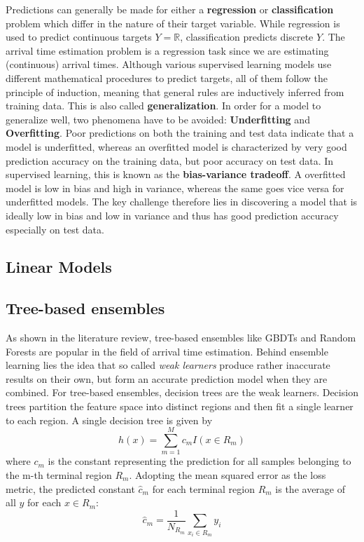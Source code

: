 Predictions can generally be made for either a \textbf{regression} or \textbf{classification} problem which differ in the nature of their target variable. 
While regression is used to predict continuous targets $ Y = \mathbb{R} $, classification predicts discrete $ Y $. The arrival time estimation problem is a regression task since we are estimating (continuous) arrival times.
Although various supervised learning models use different mathematical procedures to predict targets, all of them follow the principle of induction, meaning that general rules are inductively inferred from training data. This is also called \textbf{generalization}.  
In order for a model to generalize well, two phenomena have to be avoided: \textbf{Underfitting} and \textbf{Overfitting}. 
Poor predictions on both the training and test data indicate that a model is underfitted, whereas an overfitted model is characterized by very good prediction accuracy on the training data, but poor accuracy on test data. 
In supervised learning, this is known as the \textbf{bias-variance tradeoff}. 
A overfitted model is low in bias and high in variance, whereas the same goes vice versa for underfitted models. 
The key challenge therefore lies in discovering a model that is ideally low in bias and low in variance and thus has good prediction accuracy especially on test data.
 
\subsection{Linear Models}

\subsection{Tree-based ensembles}

As shown in the literature review, tree-based ensembles like GBDTs and Random Forests are popular in the field of arrival time estimation. Behind ensemble learning lies the idea that so called \textit{weak learners} produce rather inaccurate results on their own, but form an accurate prediction model when they are combined. For tree-based ensembles, decision trees are the weak learners. 
Decision trees partition the feature space into distinct regions and then fit a single learner to each region. 
A single decision tree is given by
\begin{equation}
h(x) = \sum_{m=1}^{M} c_m I(x \in R_m)
\end{equation}
where $ c_m $ is the constant representing the prediction for all samples belonging to the m-th terminal region $ R_m $. Adopting the mean squared error as the loss metric, the predicted constant $ \hat{c}_m $ for each terminal region $ R_m $ is the average of all $ y $ for each $ x \in R_m $:
\begin{equation}
	\hat{c}_m =  \dfrac{1}{N_{R_m}}\sum_{x_i \in R_m}^{} y_i
\end{equation}

